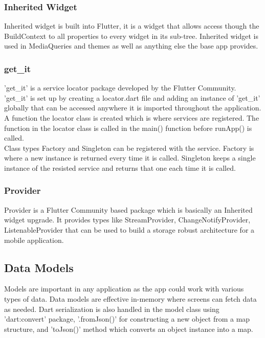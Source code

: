 \subsubsection{Inherited Widget}
Inherited widget is built into Flutter, it is a widget that allows access though the BuildContext to all properties to every widget in its sub-tree. Inherited widget is used in MediaQueries and themes as well as anything else the base app provides.

\subsubsection{get\_it}
'get\_it' is a service locator package developed by the Flutter Community. 'get\_it' is set up by creating a locator.dart file and adding an instance of 'get\_it' globally that can be accessed anywhere it is imported throughout the application. A function the locator class is created which is where services are registered. The function in the locator class is called in the main() function before runApp() is called.
\\ Class types Factory and Singleton can be registered with the service. Factory is where a new instance is returned every time it is called. Singleton keeps a single instance of the resisted service and returns that one each time it is called.

\subsubsection{Provider}
Provider is a Flutter Community based package which is basically an Inherited widget upgrade. It provides types like StreamProvider, ChangeNotifyProvider, ListenableProvider that can be used to build a storage robust architecture for a mobile application.

\subsection{Data Models}
Models are important in any application as the app could work with various types of data. Data models are effective in-memory where screens can fetch data as needed. Dart serialization is also handled in the model class using 'dart:convert' package, '.fromJson()' for constructing a new object from a map structure, and 'toJson()' method which converts an object instance into a map.

